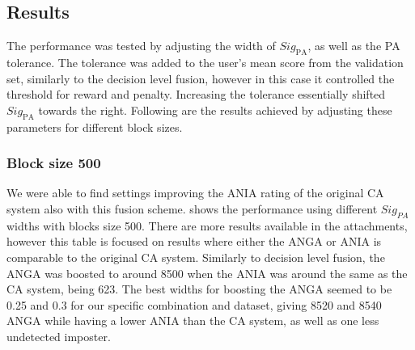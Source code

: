 \subsection{Results}
The performance was tested by adjusting the width of $\textit{Sig}_{\text{PA}}$, as well as the PA tolerance.
The tolerance was added to the user's mean score from the validation set, similarly to the decision level fusion, however in this case it controlled the threshold for reward and penalty.
Increasing the tolerance essentially shifted $\textit{Sig}_{\text{PA}}$ towards the right.
Following are the results achieved by adjusting these parameters for different block sizes.

\subsubsection{Block size 500}
We were able to find settings improving the ANIA rating of the original CA system also with this fusion scheme. %
 shows the performance using different $\textit{Sig}_{\textit{PA}}$ widths with blocks size 500.
There are more results available in the attachments, however this table is focused on results where either the ANGA or ANIA is comparable to the original CA system.
Similarly to decision level fusion, the ANGA was boosted to around 8500 when the ANIA was around the same as the CA system, being 623.
The best widths for boosting the ANGA seemed to be 0.25 and 0.3 for our specific combination and dataset, giving 8520 and 8540 ANGA while having a lower ANIA than the CA system, as well as one less undetected imposter.




